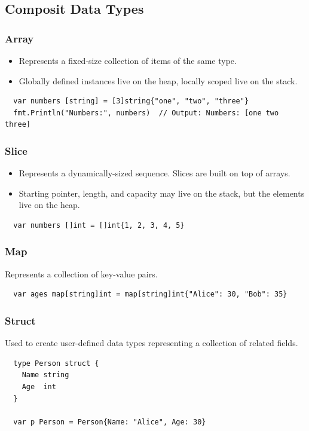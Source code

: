 \documentclass[letterpaper,12pt]{article}
\begin{document}
\subsection{Composit Data Types}
\subsubsection*{Array}
\begin{itemize}
  \item Represents a fixed-size collection of items of the same type.
  \item Globally defined instances live on the heap, locally scoped live on the stack.
\end{itemize}
\begin{verbatim}
  var numbers [string] = [3]string{"one", "two", "three"}
  fmt.Println("Numbers:", numbers)  // Output: Numbers: [one two three]
\end{verbatim}
\subsubsection*{Slice}
\begin{itemize}
  \item Represents a dynamically-sized sequence. Slices are built on top of arrays.
  \item Starting pointer, length, and capacity may live on the stack, but the elements live on the heap.
\end{itemize}
\begin{verbatim}
  var numbers []int = []int{1, 2, 3, 4, 5}
\end{verbatim}
\subsubsection*{Map}
Represents a collection of key-value pairs.
\begin{verbatim}
  var ages map[string]int = map[string]int{"Alice": 30, "Bob": 35}
\end{verbatim}
\subsubsection*{Struct}
Used to create user-defined data types representing a collection of related fields.
\begin{verbatim}
  type Person struct {
    Name string
    Age  int
  }
  
  var p Person = Person{Name: "Alice", Age: 30}  
\end{verbatim}
\end{document}
